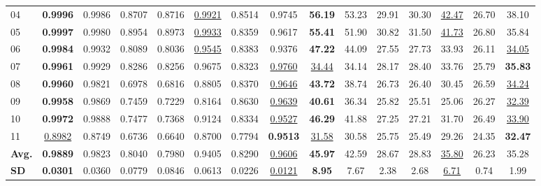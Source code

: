 \documentclass[pdflatex,iicol,sn-mathphys-num]{sn-jnl}
\begin{document}
\begin{table}[!t]
{\begin{tabular}{lccccccc|ccccccc}
  04
  & \textbf{0.9996}
  & 0.9986
  & 0.8707
  & 0.8716
  & \underline{0.9921}
  & 0.8514
  & 0.9745
  & \textbf{56.19}
  & 53.23
  & 29.91
  & 30.30
  & \underline{42.47}
  & 26.70
  & 38.10 \\

  05
  & \textbf{0.9997}
  & 0.9980
  & 0.8954
  & 0.8973
  & \underline{0.9933}
  & 0.8359
  & 0.9617
  & \textbf{55.41}
  & 51.90
  & 30.82
  & 31.50
  & \underline{41.73}
  & 26.80
  & 35.84 \\

  06
  & \textbf{0.9984}
  & 0.9932
  & 0.8089
  & 0.8036
  & \underline{0.9545}
  & 0.8383
  & 0.9376
  & \textbf{47.22}
  & 44.09
  & 27.55
  & 27.73
  & 33.93
  & 26.11
  & \underline{34.05} \\

  07
  & \textbf{0.9961}
  & 0.9929
  & 0.8286
  & 0.8256
  & 0.9675
  & 0.8323
  & \underline{0.9760}
  & \underline{34.44}
  & 34.14
  & 28.17
  & 28.40
  & 33.76
  & 25.79
  & \textbf{35.83} \\

  08
  & \textbf{0.9960}
  & 0.9821
  & 0.6978
  & 0.6816
  & 0.8805
  & 0.8370
  & \underline{0.9646}
  & \textbf{43.72}
  & 38.74
  & 26.73
  & 26.40
  & 30.45
  & 26.59
  & \underline{34.24} \\

  09
  & \textbf{0.9958}
  & 0.9869
  & 0.7459
  & 0.7229
  & 0.8164
  & 0.8630
  & \underline{0.9639}
  & \textbf{40.61}
  & 36.34
  & 25.82
  & 25.51
  & 25.06
  & 26.27
  & \underline{32.39} \\

  10
  & \textbf{0.9972}
  & 0.9888
  & 0.7477
  & 0.7368
  & 0.9124
  & 0.8334
  & \underline{0.9527}
  & \textbf{46.29}
  & 41.88
  & 27.25
  & 27.21
  & 31.70
  & 26.49
  & \underline{33.90} \\

  11
  & \underline{0.8982}
  & 0.8749
  & 0.6736
  & 0.6640
  & 0.8700
  & 0.7794
  & \textbf{0.9513}
  & \underline{31.58}
  & 30.58
  & 25.75
  & 25.49
  & 29.26
  & 24.35
  & \textbf{32.47} \\

  \midrule

  \textbf{Avg.}
  & \textbf{0.9889}
  & 0.9823
  & 0.8040
  & 0.7980
  & 0.9405
  & 0.8290
  & \underline{0.9606}
  & \textbf{45.97}
  & 42.59
  & 28.67
  & 28.83
  & \underline{35.80}
  & 26.23
  & 35.28 \\

  \textbf{SD}
  & \textbf{0.0301}
  & 0.0360
  & 0.0779
  & 0.0846
  & 0.0613
  & 0.0226
  & \underline{0.0121}
  & \textbf{8.95}
  & 7.67
  & 2.38
  & 2.68
  & \underline{6.71}
  & 0.74
  & 1.99 \\


\end{tabular}}
\end{table}
\end{document}
